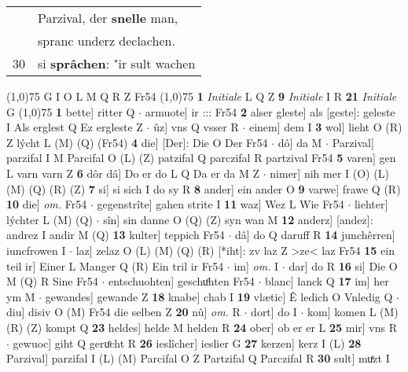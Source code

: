 \documentclass[8pt,a4paper,notitlepage]{article}
\begin{document}
\begin{table}[ht]
\begin{minipage}[t]{0.5\linewidth}
\begin{tabular}{rl}
 & Parzival, der \textbf{snelle} man,\\ 
 & spranc underz declachen.\\ 
30 & si \textbf{sprâchen}: "ir sult wachen\\ 
\end{tabular}
\scriptsize
\line(1,0){75} \newline
G I O L M Q R Z Fr54 \newline
\line(1,0){75} \newline
\textbf{1} \textit{Initiale} L Q Z  \textbf{9} \textit{Initiale} I R  \textbf{21} \textit{Initiale} G  \newline
\line(1,0){75} \newline
\textbf{1} bette] ritter Q  $\cdot$ armuote] ir ::: Fr54 \textbf{2} alser gleste] als [geste]: geleste I Als erglest Q Ez ergleste Z  $\cdot$ ûz] vns Q vsser R  $\cdot$ einem] dem I \textbf{3} wol] lieht O (R) Z lýcht L (M) (Q) (Fr54) \textbf{4} die] [Der]: Die O Der Fr54  $\cdot$ dô] da M  $\cdot$ Parzival] parzifal I M Parcifal O (L) (Z) patzifal Q parczifal R partzival Fr54 \textbf{5} varen] gen L varn varn Z \textbf{6} dôr dâ] Do er do L Q Da er da M Z  $\cdot$ nimer] nih mer I (O) (L) (M) (Q) (R) (Z) \textbf{7} si] si sich I do sy R \textbf{8} ander] ein ander O \textbf{9} varwe] frawe Q (R) \textbf{10} die] \textit{om.} Fr54  $\cdot$ gegenstrîte] gahen strite I \textbf{11} waz] Wez L Wie Fr54  $\cdot$ liehter] lýchter L (M) (Q)  $\cdot$ sîn] sin danne O (Q) (Z) syn wan M \textbf{12} anderz] [andez]: andrez I andir M (Q) \textbf{13} kulter] teppich Fr54  $\cdot$ dâ] do Q daruff R \textbf{14} junchêrren] iuncfrowen I  $\cdot$ laz] zelaz O (L) (M) (Q) (R) [*iht]: zv laz  Z >ze< laz Fr54 \textbf{15} ein teil ir] Einer L Manger Q (R) Ein tril ir Fr54  $\cdot$ im] \textit{om.} I  $\cdot$ dar] do R \textbf{16} si] Die O M (Q) R Sine Fr54  $\cdot$ entschuohten] geschuͦhten Fr54  $\cdot$ blanc] lanck Q \textbf{17} im] her ym M  $\cdot$ gewandes] gewande Z \textbf{18} knabe] chab I \textbf{19} vlætic] Ê ledich O Vnledig Q  $\cdot$ diu] disiv O (M) Fr54 die selben Z \textbf{20} nû] \textit{om.} R  $\cdot$ dort] do I  $\cdot$ kom] komen L (M) (R) (Z) kompt Q \textbf{23} heldes] helde M helden R \textbf{24} ober] ob er er L \textbf{25} mir] vns R  $\cdot$ gewuoc] giht Q geruͦcht R \textbf{26} ieslîcher] ieslier G \textbf{27} kerzen] kerz I (L) \textbf{28} Parzival] parzifal I (L) (M) Parcifal O Z Partzifal Q Parczifal R \textbf{30} sult] muͤzt I \newline
\end{minipage}
\hspace{0.5cm}

\end{table}
\end{document}
